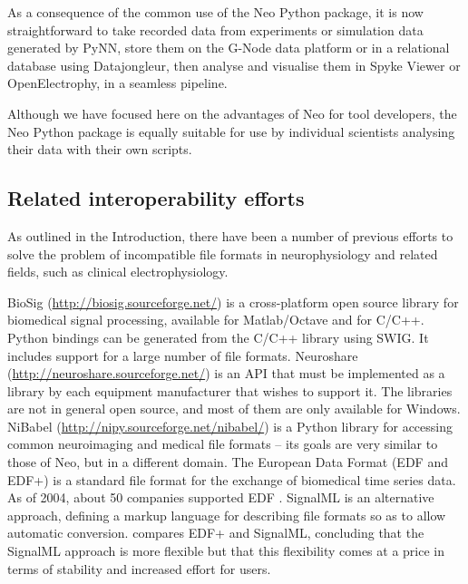 \documentclass{frontiers}
\begin{document}

As a consequence of the common use of the Neo Python package, it is now straightforward to take recorded data from experiments or simulation data generated by PyNN, store them on the G-Node data platform or in a relational database using Datajongleur, then analyse and visualise them in Spyke Viewer or OpenElectrophy, in a seamless pipeline.

Although we have focused here on the advantages of Neo for tool developers, the Neo Python package is equally suitable for use by individual scientists analysing their data with their own scripts.

\subsection{Related interoperability efforts}

As outlined in the Introduction, there have been a number of previous efforts to solve the problem of incompatible file formats in neurophysiology and related fields, such as clinical electrophysiology.

BioSig (\url{http://biosig.sourceforge.net/}) is a cross-platform open source library for biomedical signal processing, available for Matlab/Octave and for C/C++. 
Python bindings can be generated from the C/C++ library using SWIG. 
It includes support for a large number of file formats. 
Neuroshare (\url{http://neuroshare.sourceforge.net/}) is an API that must be implemented as a library by each equipment manufacturer that wishes to support it. 
The libraries are not in general open source, and most of them are only available for Windows. 
NiBabel (\url{http://nipy.sourceforge.net/nibabel/}) is a Python library for accessing common neuroimaging and medical file formats -- its goals are very similar to those of Neo, but in a different domain. 
The European Data Format (EDF and EDF+) is a standard file format for the exchange of biomedical time series data. As of 2004, about 50 companies supported EDF \citep{Kemp2004}. 
SignalML \citep{Durka2004} is an alternative approach, defining a markup language for describing file formats so as to allow automatic conversion. 
\citet{Kemp2004} compares EDF+ and SignalML, concluding that the SignalML approach is more flexible but that this flexibility comes at a price in terms of stability and increased effort for users.
\end{document}
